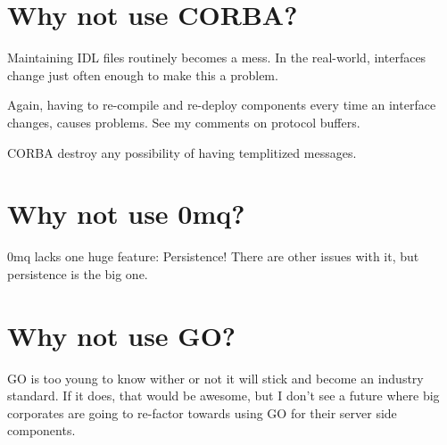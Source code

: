 \section*{Why not use C\-O\-R\-B\-A?}


\begin{DoxyEnumerate}
\item Maintaining I\-D\-L files routinely becomes a mess. In the real-\/world, interfaces change just often enough to make this a problem.
\item Again, having to re-\/compile and re-\/deploy components every time an interface changes, causes problems. See my comments on protocol buffers.
\item C\-O\-R\-B\-A destroy any possibility of having templitized messages.
\end{DoxyEnumerate}

\section*{Why not use 0mq?}

0mq lacks one huge feature\-: Persistence! There are other issues with it, but persistence is the big one.

\section*{Why not use G\-O?}

G\-O is too young to know wither or not it will stick and become an industry standard. If it does, that would be awesome, but I don't see a future where big corporates are going to re-\/factor towards using G\-O for their server side components. 